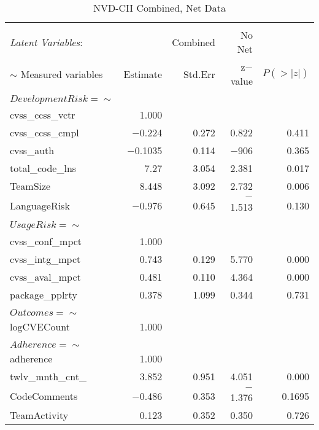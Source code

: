 \begin{table}
	\begin{center}	
		\caption{NVD-CII Combined, Net Data}
		\label{tab:results_combined2}
		\begin{tabular}{l|rrrr}
			\\[-1.8ex]\hline 
			\hline \\[-1.8ex] 
			\textit{Latent Variables}: &  & Combined & No Net & \\  
			$\sim$ Measured variables& Estimate & Std.Err & z$-$value & $P(>|z|)$ \\
			\hline \\[-1.8ex]
			$DevelopmentRisk =\sim$  & & & & \\                                   
			cvss\_ccss\_vctr   & 1.000 & &  & \\                             
			cvss\_ccss\_cmpl &  $-$0.224 &   0.272 & 0.822 &   0.411\\
			cvss\_auth     &   $-$0.1035  &  0.114  & $-$906   & 0.365\\
			total\_code\_lns  &  7.27 &   3.054 &   2.381 &   0.017\\
			TeamSize        &  8.448   & 3.092  & 2.732   & 0.006\\
			LanguageRisk    &  $-$0.976  &  0.645   & $-$1.513   & 0.130\\ 
			& & & & \\  
			$UsageRisk =\sim$     & & & & \\                                    		
			cvss\_conf\_mpct  &  1.000  &	&	&                  \\
			cvss\_intg\_mpct  &  0.743  &  0.129 &   5.770  &  0.000\\
			cvss\_aval\_mpct  &  0.481 &   0.110 &   4.364 &   0.000\\
			package\_pplrty  &  0.378 &   1.099  &  0.344 &   0.731\\	
			& & & & \\  
			$Outcomes =\sim$    & & & & \\                                     
			logCVECount     &  1.000  & & & \\                          
			& & & & \\  
			$Adherence =\sim$   & & & & \\                                      
			adherence    &     1.000        & & & \\    
			twlv\_mnth\_cnt\_  &  3.852  &  0.951  &  4.051 &   0.000\\
			CodeComments    &  $-$0.486  &  0.353  &  $-$1.376  &  0.1695\\
			TeamActivity    &  0.123  &  0.352 &   0.350 &   0.726\\	
			

\end{tabular}
\end{center}
\end{table}
